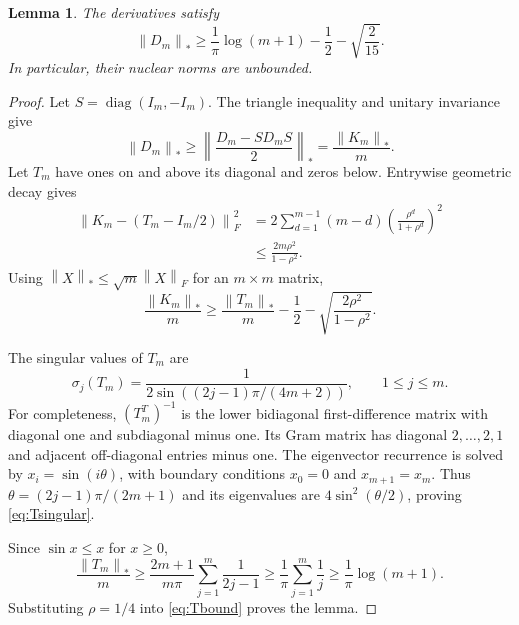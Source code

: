 \documentclass[11pt]{article}
\newtheorem{lemma}[theorem]{Lemma}
\theoremstyle{definition}
\newcommand{\diag}{\operatorname{diag}}
\newcommand{\norm}[1]{\left\lVert#1\right\rVert}
\begin{document}
\begin{lemma}\label{lem:divergence}
The derivatives satisfy
\[
 \norm{D_m}_*\ge\frac1\pi\log(m+1)-\frac12-\sqrt{\frac2{15}}.
\]
In particular, their nuclear norms are unbounded.
\end{lemma}
\begin{proof}
Let $S=\diag(I_m,-I_m)$. The triangle inequality and unitary invariance give
\[
 \norm{D_m}_*\ge\norm{\frac{D_m-SD_mS}{2}}_*
 =\frac{\norm{K_m}_*}{m}.
\]
Let $T_m$ have ones on and above its diagonal and zeros below. Entrywise geometric decay gives
\begin{align*}
 \norm{K_m-(T_m-I_m/2)}_F^2
 &=2\sum_{d=1}^{m-1}(m-d)
          \left(\frac{\rho^d}{1+\rho^d}\right)^2\\
 &\le\frac{2m\rho^2}{1-\rho^2}.
\end{align*}
Using $\norm X_*\le\sqrt m\norm X_F$ for an $m\times m$ matrix,
\begin{equation}\label{eq:Tbound}
 \frac{\norm{K_m}_*}{m}
 \ge\frac{\norm{T_m}_*}{m}-\frac12
        -\sqrt{\frac{2\rho^2}{1-\rho^2}}.
\end{equation}

The singular values of $T_m$ are
\begin{equation}\label{eq:Tsingular}
 \sigma_j(T_m)=\frac1{2\sin((2j-1)\pi/(4m+2))},
 \qquad 1\le j\le m.
\end{equation}
For completeness, $(T_m^T)^{-1}$ is the lower bidiagonal first-difference matrix with diagonal one and subdiagonal minus one. Its Gram matrix has diagonal $2,\ldots,2,1$ and adjacent off-diagonal entries minus one. The eigenvector recurrence is solved by $x_i=\sin(i\theta)$, with boundary conditions $x_0=0$ and $x_{m+1}=x_m$. Thus $\theta=(2j-1)\pi/(2m+1)$ and its eigenvalues are $4\sin^2(\theta/2)$, proving \eqref{eq:Tsingular}.

Since $\sin x\le x$ for $x\ge0$,
\[
 \frac{\norm{T_m}_*}{m}
 \ge\frac{2m+1}{m\pi}\sum_{j=1}^m\frac1{2j-1}
 \ge\frac1\pi\sum_{j=1}^m\frac1j
 \ge\frac1\pi\log(m+1).
\]
Substituting $\rho=1/4$ into \eqref{eq:Tbound} proves the lemma.
\end{proof}
\end{document}
